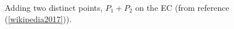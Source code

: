 \begin{figure}[H]
	  \caption{\label{fig:DH:DHKE_6}Adding two distinct points, $P_1 + P_2$ on the EC (from reference (\ref{wikipedia2017})).}
\end{figure}

